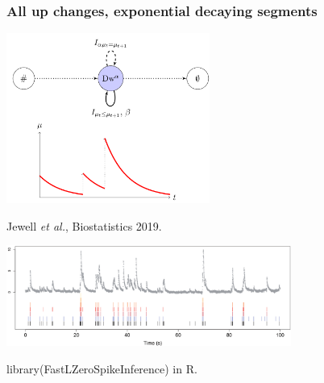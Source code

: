 \documentclass{beamer}
\begin{document}



\begin{frame}
  \frametitle{All up changes, exponential decaying segments}
  \includegraphics[width=0.5\textwidth]{gfpop-decay}

  Jewell \emph{et al.}, Biostatistics 2019.

  \includegraphics[width=0.7\textwidth]{intro-neuroscience}

  library(FastLZeroSpikeInference) in R.

\end{frame}


\end{document}
